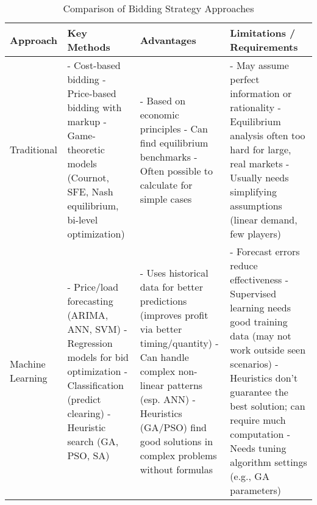 \documentclass[conference]{IEEEtran}
\begin{document}
\begin{table*}[ht]
    \caption{Comparison of Bidding Strategy Approaches}
    \label{tab:compare}
    \centering
    \begin{tabular}{|p{3cm}|p{4.2cm}|p{4.8cm}|p{4.8cm}|}
        \hline
        \textbf{Approach} & \textbf{Key Methods} & \textbf{Advantages} & \textbf{Limitations / Requirements} \\
        \hline
        Traditional & 
            - Cost-based bidding \newline 
            - Price-based bidding with markup \newline 
            - Game-theoretic models (Cournot, SFE, Nash equilibrium, bi-level optimization) 
        & 
            - Based on economic principles \newline 
            - Can find equilibrium benchmarks \newline 
            - Often possible to calculate for simple cases 
        & 
            - May assume perfect information or rationality \newline 
            - Equilibrium analysis often too hard for large, real markets \newline 
            - Usually needs simplifying assumptions (linear demand, few players) \\
        \hline
        Machine Learning & 
            - Price/load forecasting (ARIMA, ANN, SVM) \newline 
            - Regression models for bid optimization \newline 
            - Classification (predict clearing) \newline 
            - Heuristic search (GA, PSO, SA) 
        & 
            - Uses historical data for better predictions (improves profit via better timing/quantity) \cite{Gountis2004} \newline 
            - Can handle complex non-linear patterns (esp. ANN) \newline 
            - Heuristics (GA/PSO) find good solutions in complex problems without formulas \cite{Gountis2004, Bajpai2008} 
        & 
            - Forecast errors reduce effectiveness \newline 
            - Supervised learning needs good training data (may not work outside seen scenarios) \newline 
            - Heuristics don't guarantee the best solution; can require much computation \newline 
            - Needs tuning algorithm settings (e.g., GA parameters) \\

\end{tabular}
\end{table*}
\end{document}
